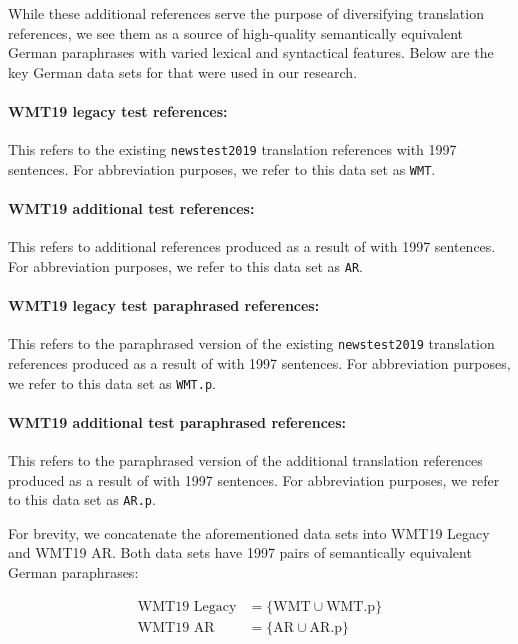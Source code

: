 \documentclass[11pt,a4paper]{article}
\begin{document}
While these additional references serve the purpose of diversifying translation references, we see them as a source of high-quality semantically equivalent German paraphrases with varied lexical and syntactical features. Below are the key German data sets for that were used in our research.

\paragraph{WMT19 legacy test references:} This refers to the existing \texttt{newstest2019} translation references with 1997 sentences. For abbreviation purposes, we refer to this data set as \texttt{WMT}. 

\paragraph{WMT19 additional test references:} This refers to additional references produced as a result of \citet{freitag-bleu-paraphrase-references-2020} with 1997 sentences. For abbreviation purposes, we refer to this data set as \texttt{AR}. 

\paragraph{WMT19 legacy test paraphrased references:} This refers to the paraphrased version of the existing \texttt{newstest2019} translation references produced as a result of \citet{freitag-bleu-paraphrase-references-2020} with 1997 sentences. For abbreviation purposes, we refer to this data set as \texttt{WMT.p}. 

\paragraph{WMT19 additional test paraphrased references:}This refers to the paraphrased version of the additional translation references produced as a result of \citet{freitag-bleu-paraphrase-references-2020} with 1997 sentences. For abbreviation purposes, we refer to this data set as \texttt{AR.p}.

For brevity, we concatenate the aforementioned data sets into WMT19 Legacy and WMT19 AR. Both data sets have 1997 pairs of semantically equivalent German paraphrases:

\vspace{-10pt}
\begin{align}
  \text{WMT19 Legacy} &= \{\text{WMT} \cup \text{WMT.p} \} \label{wmt19legacy} \\
  \text{WMT19 AR} &= \{\text{AR} \cup \text{AR.p} \} \label{wmt19ar}
\end{align}
\end{document}
